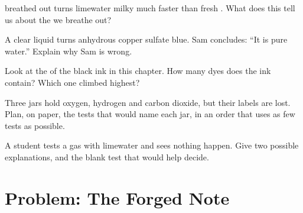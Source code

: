 \begin{exercise}[$\star\star$]\label{exo:g7:identifying-substances:8}
 breathed out turns limewater milky much faster than fresh .
What does this tell us about the  we breathe out?
\end{exercise}

\begin{exercise}[$\star\star$]\label{exo:g7:identifying-substances:9}
A clear liquid turns anhydrous copper sulfate blue. Sam concludes:
``It is pure water.'' Explain why Sam is wrong.
\end{exercise}

\begin{exercise}[$\star\star$]\label{exo:g7:identifying-substances:10}
Look at the  of the black ink in this chapter. How many dyes
does the ink contain? Which one climbed highest?
\end{exercise}

\begin{exercise}[$\star\star\star$]\label{exo:g7:identifying-substances:11}
Three jars hold oxygen, hydrogen and carbon dioxide, but their labels are
lost. Plan, on paper, the tests that would name each jar, in an order
that uses as few tests as possible.
\end{exercise}

\begin{exercise}[$\star\star\star$]\label{exo:g7:identifying-substances:12}
A student tests a gas with limewater and sees nothing happen. Give two
possible explanations, and the blank test that would help decide.
\end{exercise}

\section{Problem: The Forged Note}

